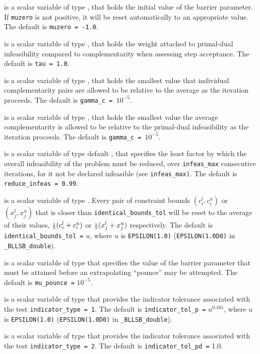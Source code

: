 \documentclass{galahad}
\newcommand{\packagename}{BLLSB}
\newcommand{\fullpackagename}{\libraryname\_\packagename}
\begin{document}
\begin{description}
  is a scalar variable of type \realdp, that holds the
initial value of the barrier parameter. If {\tt muzero} is
not positive, it will be reset automatically to an appropriate value.
The default is {\tt muzero = -1.0}.

  is a scalar variable of type \realdp, that holds the
weight attached to primal-dual infeasibility compared to complementarity
when assessing step acceptance.
The default is {\tt tau = 1.0}.

  is a scalar variable of type \realdp, that holds the
smallest value that individual complementarity pairs are allowed
to be relative to the average as the iteration proceeds.
The default is {\tt gamma\_c = $10^{-5}$}.

  is a scalar variable of type \realdp, that holds the
smallest value the average complementarity is allowed
to be relative to the primal-dual infeasibility as the iteration proceeds.
The default is {\tt gamma\_c = $10^{-5}$}.

  is a scalar variable of type default
\realdp, that specifies the
least factor by which the overall infeasibility of the problem must be reduced,
over {\tt infeas\_max} consecutive iterations,
for it not be declared infeasible (see {\tt infeas\_max)}.
The default is {\tt reduce\_infeas = 0.99}.

is a scalar variable of type \realdp.
Every pair of constraint bounds
$(c_{i}^{l}, c_{i}^{u})$ or $(x_{j}^{l}, x_{j}^{u})$
that is closer than {\tt identical\_bounds\_tol}
will be reset to the average of their values,
${\scriptstyle \frac{1}{2}} (c_{i}^{l} + c_{i}^{u})$ or ${\scriptstyle \frac{1}{2}} (x_{j}^{l} + x_{j}^{u})$
respectively.
The default is {\tt identical\_bounds\_tol =} $u$,
where $u$ is {\tt EPSILON(1.0)} ({\tt EPSILON(1.0D0)} in
{\tt \fullpackagename\_double}).

is a scalar variable of type \realdp that specifies
the value of the barrier parameter that must be attained before an 
extrapolating ``pounce'' may be attempted.
The default is {\tt mu\_pounce =} $10^{-5}$.

is a scalar variable of type \realdp that
provides the indicator tolerance associated with the test
{\tt indicator\_type = 1}.
The default is {\tt indicator\_tol\_p =} $u^{0.165}$,
where $u$ is {\tt EPSILON(1.0)} ({\tt EPSILON(1.0D0)} in
{\tt \fullpackagename\_double}).

is a scalar variable of type \realdp that
provides the indicator tolerance associated with the test
{\tt indicator\_type = 2}.
The default is {\tt indicator\_tol\_pd =} 1.0.


\end{description}
\end{document}
